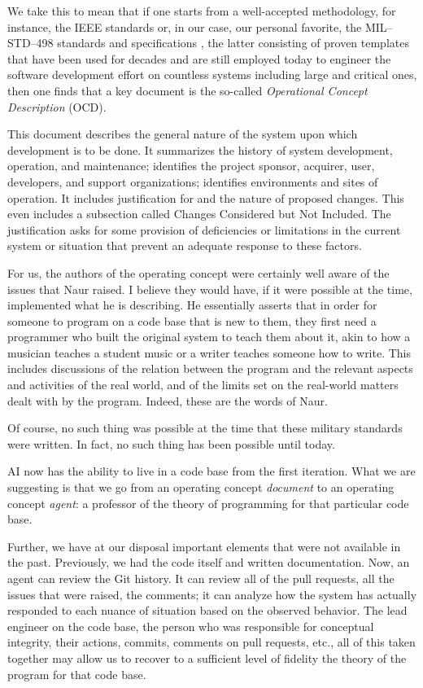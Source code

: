 \documentclass[12pt]{extarticle}
\begin{document}
We take this to mean that if one starts from a well-accepted
methodology, for instance, the IEEE standards or, in our case, our
personal favorite, the MIL--STD--498 standards and
specifications \cite{milstd498}, the latter consisting of proven templates
that have been used for decades and are still employed today to
engineer the software development effort on countless systems
including large and critical ones, then one finds that a key document
is the so-called \emph{Operational Concept Description} (OCD).

This document describes the general nature of the system upon which
development is to be done. It summarizes the history of system
development, operation, and maintenance; identifies the project
sponsor, acquirer, user, developers, and support organizations;
identifies environments and sites of operation. It includes justification for and the nature of proposed changes. This even includes a
subsection called Changes Considered but Not Included. The
justification asks for some provision of deficiencies or limitations
in the current system or situation that prevent an adequate response to
these factors.

For us, the authors of the operating concept were certainly well aware
of the issues that Naur raised. I believe they would have, if it were
possible at the time, implemented what he is describing. He
essentially asserts that in order for someone to program on a code base that is new to them, they first need a programmer who built the
original system to teach them about it, akin to how a musician teaches
a student music or a writer teaches someone how to write. This
includes discussions of the relation between the program and the
relevant aspects and activities of the real world, and of the limits
set on the real-world matters dealt with by the program. Indeed, these
are the words of Naur.

Of course, no such thing was possible at the time that these military
standards were written. In fact, no such thing has been possible until
today.

AI now has the ability to live in a code base from the first iteration. What we are
suggesting is that we go from an operating concept \emph{document} to an operating concept \emph{agent}: a professor of
the theory of programming for that particular code base.

Further, we have at our disposal important elements that were not available in
the past. Previously, we had the code itself and written
documentation. Now, an agent can review the Git history. It can
review all of the pull requests, all the issues that were raised, the comments; it
can analyze how the system has actually responded to each nuance of
situation based on the observed behavior. The lead engineer on the code base, the person who was responsible for conceptual
integrity, their actions, commits, comments on pull requests, etc., all of this taken together may allow us to recover to a sufficient level of fidelity the theory of the program for that code base.
\end{document}
